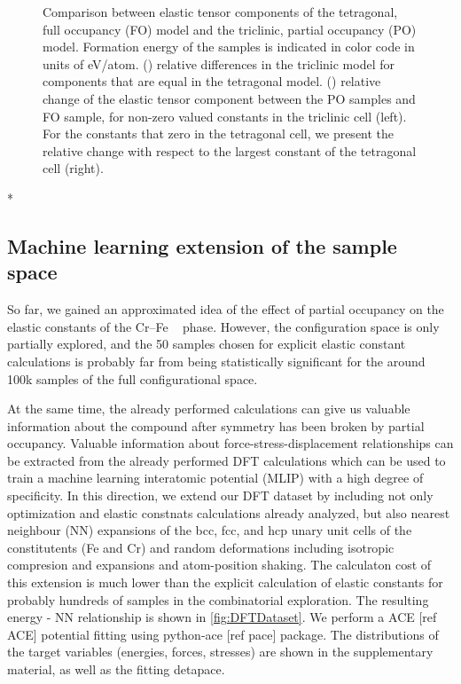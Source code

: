 \documentclass[superscriptaddress, 12pt]{revtex4-2}%
\newcommand{\MFnew}[1]{{\color{purple} #1}}
\newcommand{\MFmarginpar}[3]{\MFnew{#1} \marginpar{#2 \tiny \MFnew{#1 #3}}}
\begin{document}
\begin{figure}[H]
  \caption{\protect\label{fig:ResultsElasticConstants} 
    Comparison between elastic tensor components of the tetragonal, full occupancy (FO) model and the triclinic,
    partial occupancy (PO) model. 
    Formation energy of the samples is indicated in color code in units of eV/atom.
    () relative differences in the triclinic model for components that are equal in the tetragonal model. 
    () relative change of the elastic tensor component between the PO samples and FO sample, for non-zero valued constants in the triclinic cell (left). 
    For the constants that zero in the tetragonal cell, we present the relative change with respect to the largest constant of the tetragonal cell (right).
  }
\end{figure}\MFmarginpar{*}{}{Which FO sample?}

\subsection{Machine learning extension of the sample space}

So far, we gained an approximated idea of the effect of partial occupancy on the elastic constants of the Cr--Fe \textsigma ~ phase.
However, the configuration space is only partially explored, and the 50 samples chosen for explicit elastic constant calculations is probably far from being statistically significant for the around 100k samples of the full configurational space. 

At the same time, the already performed calculations can give us valuable information about the compound after symmetry has been broken by partial occupancy. 
Valuable information about force-stress-displacement relationships can be extracted from the already performed DFT calculations which can be used to train a machine learning interatomic potential (MLIP) with a high degree of specificity. 
In this direction, we extend our DFT dataset by including not only optimization and elastic constnats calculations already analyzed, but also nearest neighbour (NN) expansions of the bcc, fcc, and hcp unary unit cells of the constitutents (Fe and Cr) and random deformations including isotropic compresion and expansions and atom-position shaking.
The calculaton cost of this extension is much lower than the explicit calculation of elastic constants for probably hundreds of samples in the combinatorial exploration.
The resulting energy - NN relationship is shown in \autoref{fig:DFTDataset}.
We perform a ACE\MFnew{[ref ACE]} potential fitting using python-ace\MFnew{[ref pace]} package.
The distributions of the target variables (energies, forces, stresses) are shown in the supplementary material, as well as the fitting detapace.
\end{document}
